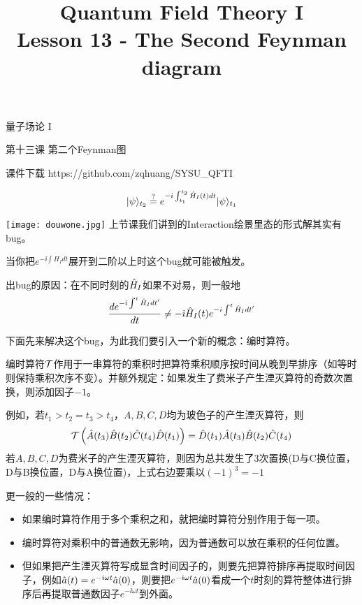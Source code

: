 \documentclass[CJK]{beamer}
\title{Quantum Field Theory I \\ Lesson 13 - The Second Feynman diagram}
\author{}
\date{}
\begin{document}
\begin{frame}
 
\begin{center}
\begin{Large}
\bch
量子场论 I 

{\vskip 0.3in}

第十三课 第二个Feynman图

\ech
\end{Large}
\end{center}

\vskip 0.2in

\bch
课件下载
\ech
https://github.com/zqhuang/SYSU\_QFTI

\end{frame}

\begin{frame}
\bch

$$|\psi\rangle_{t_2} \stackrel{?}{=} e^{-{\dot{\imath}}\int_{t_1}^{t_2} {\hat{H}}_I(t) dt} |\psi\rangle_{t_1}$$

\texttt{[image: douwone.jpg]}
\emini
{}
上节课我们讲到的Interaction绘景里态的形式解其实有bug。

当你把$e^{-\ii\int H_Idt}$展开到二阶以上时这个bug就可能被触发。

\emini


\skipline
{\small
出bug的原因：在不同时刻的${\hat{H}}_I$如果不对易，则一般地$$\frac{d e^{-{\dot{\imath}}\int^t {\hat{H}}_I dt'}}{dt} \ne -{\dot{\imath}} {\hat{H}}_I(t) e^{-{\dot{\imath}}\int^t {\hat{H}}_I dt'}$$
\skipline

下面先来解决这个bug，为此我们要引入一个新的概念：编时算符。
}
\ech
\end{frame}

\begin{frame}
\bch
{\small
编时算符${\mathcal{T}}$作用于一串算符的乘积时把算符乘积顺序按时间从晚到早排序（如等时则保持乘积次序不变）。并额外规定：如果发生了费米子产生湮灭算符的奇数次置换，则添加因子$-1$。

例如，若$t_1>t_2 = t_3>t_4$，$A,B,C,D$均为玻色子的产生湮灭算符，则
$$\mathcal{T}\left(\hat{A}(t_3)\hat{B}(t_2)\hat{C}(t_4)\hat{D}(t_1)\right) = \hat{D}(t_1)\hat{A}(t_3)\hat{B}(t_2)\hat{C}(t_4)$$
若$A, B, C, D$为费米子的产生湮灭算符，则因为总共发生了3次置换(D与C换位置，D与B换位置，D与A换位置)，上式右边要乘以$(-1)^3 = -1$
}
\skipline
{\scriptsize
更一般的一些情况：
\begin{itemize}
\item{如果编时算符作用于多个乘积之和，就把编时算符分别作用于每一项。}
\item{编时算符对乘积中的普通数无影响，因为普通数可以放在乘积的任何位置。}
\item{但如果把产生湮灭算符写成显含时间因子的，则要先把算符排序再提取时间因子，例如${\hat{a}}(t) = e^{-{\dot{\imath}}\omega t}{\hat{a}}(0)$，则要把$e^{-{\dot{\imath}}\omega t}{\hat{a}}(0)$看成一个$t$时刻的算符整体进行排序后再提取普通数因子$e^{-\ii\omega t}$到外面。}
\end{itemize}
}
\ech
\end{frame}
\end{document}
